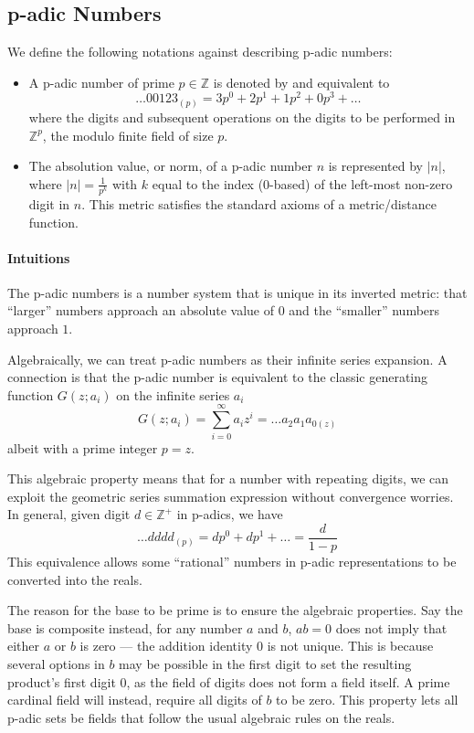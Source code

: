 \documentclass[11pt]{article}
\begin{document}
\subsection{p-adic Numbers}
We define the following notations against describing p-adic numbers:
\begin{itemize}
	\item A p-adic number of prime $p\in\mathbb{Z}$ is denoted by and equivalent to
	\[
		\dots 00123_{(p)} = 3 p^0 + 2 p^1 + 1 p^2 + 0 p^3 + \dots
	\]
	where the digits and subsequent operations on the digits to be performed in $\mathbb{Z}^p$, the modulo finite field of size $p$.
	\item The absolution value, or norm, of a p-adic number $n$ is represented by $|n|$, where $|n| = \frac{1}{p^k}$ with $k$ equal to the index (0-based) of the left-most non-zero digit in $n$. This metric satisfies the standard axioms of a metric/distance function.
\end{itemize}

\paragraph{Intuitions}
The p-adic numbers is a number system that is unique in its inverted metric: that ``larger'' numbers approach an absolute value of $0$ and the ``smaller'' numbers approach $1$.

Algebraically, we can treat p-adic numbers as their infinite series expansion. A connection is that the p-adic number is equivalent to the classic generating function $G(z; a_i)$ on the infinite series $a_i$
\[
	G(z; a_i) = \sum_{i=0}^{\infty} a_i z^i = \dots a_2 a_1 a_{0(z)}
\]
albeit with a prime integer $p = z$.

This algebraic property means that for a number with repeating digits, we can exploit the geometric series summation expression without convergence worries. In general, given digit $d \in \mathbb{Z}^+$ in p-adics, we have
\[
	\dots dddd_{(p)} = d p^0 + d p^1 + \dots = \frac{d}{1-p}
\]
This equivalence allows some ``rational'' numbers in p-adic representations to be converted into the reals.

The reason for the base to be prime is to ensure the algebraic properties. Say the base is composite instead, for any number $a$ and $b$, $ab=0$ does not imply that either $a$ or $b$ is zero --- the addition identity $0$ is not unique. This is because several options in $b$ may be possible in the first digit to set the resulting product's first digit $0$, as the field of digits does not form a field itself. A prime cardinal field will instead, require all digits of $b$ to be zero. This property lets all p-adic sets be fields that follow the usual algebraic rules on the reals.
\end{document}
